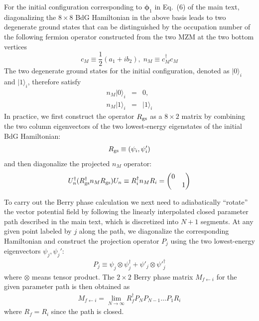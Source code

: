 \documentclass[aps,prb,showpacs,amsmath,amssymb,superscriptaddress]{revtex4-2}
\begin{document}
For the initial configuration corresponding to $\bm \phi_1$ in Eq.~(6) of the main text, diagonalizing the $8\times 8$ BdG Hamiltonian in the above basis leads to two degenerate ground states that can be distinguished by the occupation number of the following fermion operator constructed from the two MZM at the two bottom vertices
\begin{equation}
  c_M \equiv  \dfrac{1}{2} ( a_1 + i b_2 ),\; n_M \equiv c_M^\dag c_M
\end{equation}
The two degenerate ground states for the initial configuration, denoted as $|0\rangle_i$ and $|1\rangle_i$, therefore satisfy
\begin{eqnarray}
    n_M | 0 \rangle_i &=& 0,\\\nonumber
    n_M | 1 \rangle_i &=& |1\rangle_i
\end{eqnarray}
In practice, we first construct the operator $R_{\rm gs}$ as a $8\times 2$ matrix by combining the two column eigenvectors of the two lowest-energy eigenstates of the initial BdG Hamiltonian:
\begin{eqnarray}
    R_{\rm gs}\equiv (\psi_i,\psi_i')
\end{eqnarray}
and then diagonalize the projected $n_M$ operator:
\begin{eqnarray}
    U_n^\dag (R_{\rm gs}^\dag n_M R_{\rm gs}) U_n \equiv R_i^\dag n_M R_i = \begin{pmatrix}
        0 & \\
       & 1
    \end{pmatrix}
\end{eqnarray}

To carry out the Berry phase calculation we next need to adiabatically ``rotate'' the vector potential field by following the linearly interpolated closed parameter path described in the main text, which is discretized into $N + 1$ segments. At any given point labeled by $j$ along the path, we diagonalize the corresponding Hamiltonian and construct the projection operator $P_j$ using the two lowest-energy eigenvectors $\psi_j,\psi_j'$:
\begin{eqnarray}
    P_j \equiv \psi_j\otimes \psi_j^\dag + \psi'_j\otimes \psi'^\dag_j
\end{eqnarray}
where $\otimes$ means tensor product. The $2\times 2$ Berry phase matrix $M_{f\leftarrow i}$ for the given parameter path is then obtained as
\begin{eqnarray}
 M_{f\leftarrow i} = \lim_{N\rightarrow \infty} R_f^\dag P_{N} P_{N-1}\dots P_{1} R_i
\end{eqnarray}
where $R_f = R_i$ since the path is closed.
\end{document}
